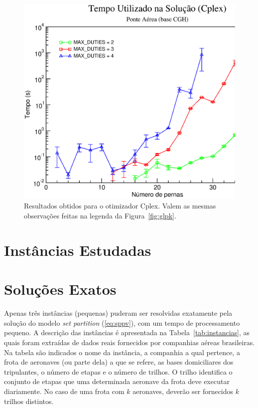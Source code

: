 \begin{figure}[htb]
	\begin{center}
		\includegraphics[scale=0.45,angle=0]{fig/cplex_solution_time.eps}
		\caption{Resultados obtidos para o otimizador Cplex. Valem as mesmas observações feitas na 
		legenda da Figura~\ref{fig:glpk}.}
		\label{fig:cplex}
	\end{center}
\end{figure}


\section{Instâncias Estudadas}
\label{sec:instancias}


\section{Soluções Exatos}
\label{sec:solucoes_exatas}

Apenas três instâncias (pequenas) puderam ser resolvidas exatamente pela solução do modelo {\it set
partition} (\ref{eq:sppv}), com um tempo de processamento pequeno. A descrição das instâncias é
apresentada na Tabela~\ref{tab:instancias}, as quais foram extraídas de dados reais fornecidos por
companhias aéreas brasileiras. Na tabela são indicados o nome da instância, a companhia a qual
pertence, a frota de aeronaves (ou parte dela) a que se refere, as bases domiciliares dos
tripulantes, o número de etapas e o número de trilhos. O trilho identifica o conjunto de etapas que
uma determinada aeronave da frota deve executar diariamente. No caso de uma frota com $k$ aeronaves,
deverão ser fornecidos $k$ trilhos distintos.

